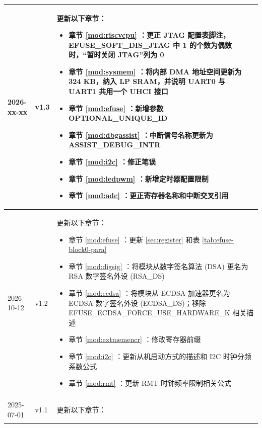 \begin{longtable}[l]{ | m{2cm} | m{1.5cm} | m{12cm} | }
    2026-xx-xx & v1.3 &
    更新以下章节：
    \begin{itemize}
    \item 章节 \ref{mod:riscvcpu} \textit{\nameref{mod:riscvcpu}}：更正 JTAG 配置表脚注，EFUSE\_SOFT\_DIS\_JTAG 中 1 的个数为偶数时，“暂时关闭 JTAG”列为 0
    \item 章节 \ref{mod:sysmem} \textit{\nameref{mod:sysmem}}：将内部 DMA 地址空间更新为 324 KB，纳入 LP SRAM，并说明 UART0 与 UART1 共用一个 UHCI 接口
    \item 章节 \ref{mod:efuse} \textit{\nameref{mod:efuse}}：新增参数 OPTIONAL\_UNIQUE\_ID %
    \item 章节 \ref{mod:dbgassist} \textit{\nameref{mod:dbgassist}}：中断信号名称更新为 ASSIST\_DEBUG\_INTR %
    \item 章节 \ref{mod:i2c} \textit{\nameref{mod:i2c}}：修正笔误 %
    \item 章节 \ref{mod:ledpwm} \textit{\nameref{mod:ledpwm}}：新增定时器配置限制 %
    \item 章节 \ref{mod:adc} \textit{\nameref{mod:adc}}：更正寄存器名称和中断交叉引用 %
    \end{itemize}
    \\\hline
    2026-10-12 & v1.2 &
    更新以下章节：
    \begin{itemize}
    \item 章节 \ref{mod:efuse} \textit{\nameref{mod:efuse}}：更新 \ref{sec:register} \textit{\nameref{sec:register}} 和表 \ref{tab:efuse-block0-para} %
    \item 章节 \ref{mod:digsig} \textit{\nameref{mod:digsig}}：将模块从数字签名算法 (DSA) 更名为 RSA 数字签名外设 (RSA\_DS) %
    \item 章节 \ref{mod:ecdsa} \textit{\nameref{mod:ecdsa}}：将模块从 ECDSA 加速器更名为 ECDSA 数字签名外设 (ECDSA\_DS)；移除 EFUSE\_ECDSA\_FORCE\_USE\_HARDWARE\_K 相关描述
    \item 章节 \ref{mod:extmemencr} \textit{\nameref{mod:extmemencr}}：修改寄存器前缀
    \item 章节 \ref{mod:i2c} \textit{\nameref{mod:i2c}}：更新从机启动方式的描述和 I2C 时钟分频系数公式 %
    \item 章节 \ref{mod:rmt} \textit{\nameref{mod:rmt}}：更新 RMT 时钟频率限制相关公式 %
    \end{itemize}
    \\\hline
    2025-07-01 & v1.1 &
    更新以下章节：
    \begin{itemize}

\end{itemize}
\end{longtable}
